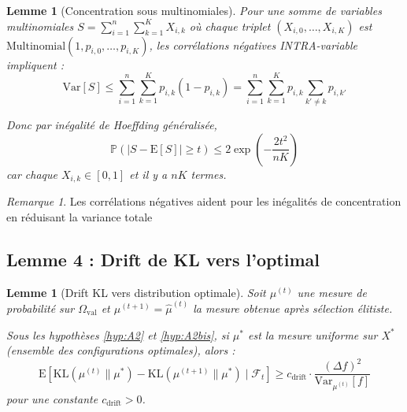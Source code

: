 \documentclass[12pt,a4paper]{article}
\newtheorem{lemma}[theorem]{Lemme}
\theoremstyle{definition}
\theoremstyle{remark}
\newtheorem{remark}[theorem]{Remarque}
\newcommand{\E}{\text{E}}
\newcommand{\Prob}{\mathbb{P}}
\newcommand{\Var}{\text{Var}}
\newcommand{\KL}{\text{KL}}
\begin{document}
	\begin{lemma}[Concentration sous multinomiales]\label{lem:concentration-multinom}
		Pour une somme de variables multinomiales $S = \sum_{i=1}^n \sum_{k=1}^K X_{i,k}$ où chaque triplet $(X_{i,0}, \ldots, X_{i,K})$ est $\text{Multinomial}(1, p_{i,0}, \ldots, p_{i,K})$, les corrélations négatives INTRA-variable impliquent :
		\begin{equation}
			\Var[S] \leq \sum_{i=1}^n \sum_{k=1}^K p_{i,k}(1 - p_{i,k}) = \sum_{i=1}^n \sum_{k=1}^K p_{i,k}\sum_{k'\neq k} p_{i,k'}
		\end{equation}
		
		Donc par inégalité de Hoeffding généralisée,
		\begin{equation}
			\Prob(|S - \E[S]| \geq t) \leq 2\exp\left(-\frac{2t^2}{nK}\right)
		\end{equation}
		car chaque $X_{i,k} \in [0,1]$ et il y a $nK$ termes.
	\end{lemma}
	
	\begin{remark}
		Les corrélations négatives aident pour les inégalités de concentration en réduisant la variance totale
	\end{remark}
	
	\subsection{Lemme 4 : Drift de KL vers l'optimal }
	
	\begin{lemma}[Drift KL vers distribution optimale]\label{lem:kl-drift}
		Soit $\mu^{(t)}$ une mesure de probabilité sur $\Omega_{\text{val}}$ et $\mu^{(t+1)} = \hat{\mu}^{(t)}$ la mesure obtenue après sélection élitiste.
		
		Sous les hypothèses \ref{hyp:A2} et \ref{hyp:A2bis}, si $\mu^*$ est la mesure  uniforme sur $X^*$ (ensemble des configurations optimales), alors :
		\begin{equation}
			\E\left[\KL(\mu^{(t)}\|\mu^*) - \KL(\mu^{(t+1)}\|\mu^*) \mid \mathcal{F}_t\right] \geq c_{\text{drift}} \cdot \frac{(\Delta f)^2}{\Var_{\mu^{(t)}}[f]}
		\end{equation}
		pour une constante $c_{\text{drift}} > 0$.
	\end{lemma}
	
\end{document}
